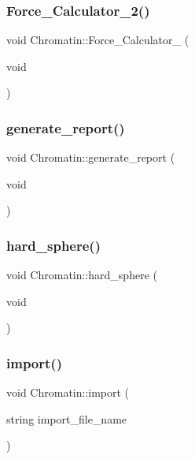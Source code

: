 \mbox{\label{classChromatin_a6afb5d9eb8c4d6e1c9e8145e1bccad6c}} 
\subsubsection{\texorpdfstring{Force\_Calculator\_2()}{Force\_Calculator\_2()}}
{\footnotesize\ttfamily void Chromatin\+::\+Force\+\_\+\+Calculator\+\_ (\begin{DoxyParamCaption}\item[{void}]{ }\end{DoxyParamCaption})}

\mbox{\label{classChromatin_a0c988a3b80895ed2c070625646d8ccd3}} 
\subsubsection{\texorpdfstring{generate\_report()}{generate\_report()}}
{\footnotesize\ttfamily void Chromatin\+::generate\+\_\+report (\begin{DoxyParamCaption}\item[{void}]{ }\end{DoxyParamCaption})}

\mbox{\label{classChromatin_aba53b27dd0a93bbd93fe619390e54749}} 
\subsubsection{\texorpdfstring{hard\_sphere()}{hard\_sphere()}}
{\footnotesize\ttfamily void Chromatin\+::hard\+\_\+sphere (\begin{DoxyParamCaption}\item[{void}]{ }\end{DoxyParamCaption})}

\mbox{\label{classChromatin_a398e59a7a3ce36b0cb74dae0cfbba295}} 
\subsubsection{\texorpdfstring{import()}{import()}}
{\footnotesize\ttfamily void Chromatin\+::import (\begin{DoxyParamCaption}\item[{string}]{import\+\_\+file\+\_\+name }\end{DoxyParamCaption})}

